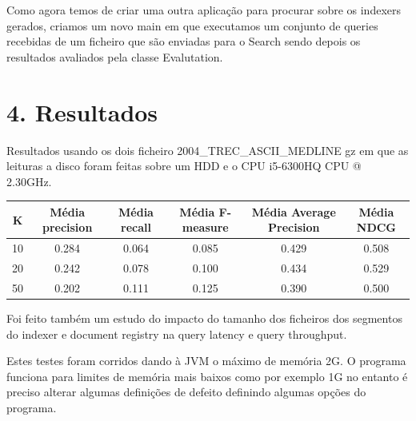 \documentclass[12pt]{article}
\begin{document}
Como agora temos de criar uma outra aplicação para procurar sobre os
indexers gerados, criamos um novo main em que executamos um conjunto
de queries recebidas de um ficheiro que são enviadas para o Search
sendo depois os resultados avaliados pela classe Evalutation.

\newpage

\section*{4. Resultados}

Resultados usando os dois ficheiro 2004\_TREC\_ASCII\_MEDLINE gz em
que as leituras a disco foram feitas sobre um HDD e o CPU i5-6300HQ
CPU @ 2.30GHz.

\begin{center}
    \small
    \begin{tabular}{| c | c | c | c | c | c |}
            \hline
            K
            & \bf  Média precision
            & \bf  Média recall
            & \bf  Média F-measure
            & \bf  Média Average Precision
            & \bf  Média NDCG \\ \hline

            10
            & 0.284
            & 0.064
            & 0.085
            & 0.429
            & 0.508 \\ \hline

            20
            & 0.242
            & 0.078
            & 0.100
            & 0.434
            & 0.529 \\ \hline

            50
            & 0.202
            & 0.111
            & 0.125
            & 0.390
            & 0.500 \\ \hline

    \end{tabular}
\end{center}

Foi feito também um estudo do impacto do tamanho dos ficheiros dos
segmentos do indexer e document registry na query latency e query
throughput.

Estes testes foram corridos dando à JVM o máximo de memória 2G.
O programa funciona para limites de memória mais baixos como por
exemplo 1G no entanto é preciso alterar algumas definições de defeito
definindo algumas opções do programa.
\end{document}
